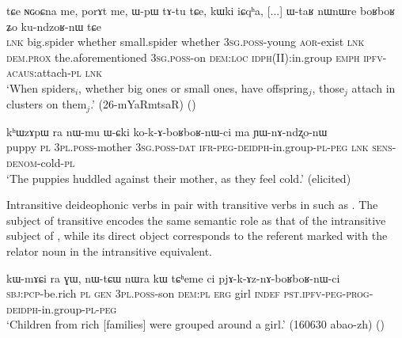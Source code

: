 \begin{exe}
\ex \label{ex:boRboR.kundzoRnW}
\gll tɕe ɴɢoɕna me, porɤt me, ɯ-pɯ tɤ-tu tɕe, kɯki iɕqʰa, [...] ɯ-taʁ nɯnɯre boʁboʁ ʑo ku-ndzoʁ-nɯ tɕe \\
\textsc{lnk} big.spider whether small.spider whether \textsc{3sg}.\textsc{poss}-young \textsc{aor}-exist \textsc{lnk} \textsc{dem}.\textsc{prox} the.aforementioned { } \textsc{3sg}.\textsc{poss}-on \textsc{dem}:\textsc{loc} \textsc{idph}(II):in.group \textsc{emph} \textsc{ipfv}-\textsc{acaus}:attach-\textsc{pl} \textsc{lnk} \\
\glt `When spiders$_i$, whether big ones or small ones, have offspring$_j$, those$_j$ attach in clusters on them$_j$.' (26-mYaRmtsaR)  
()
\end{exe}

\begin{exe}
\ex \label{ex:kokAboRboRnW}
\gll kʰɯzɤpɯ ra nɯ-mu ɯ-ɕki ko-k-ɤ-boʁboʁ-nɯ-ci ma ɲɯ-nɤ-ndʐo-nɯ \\
puppy \textsc{pl} \textsc{3pl}.\textsc{poss}-mother \textsc{3sg}.\textsc{poss}-\textsc{dat} \textsc{ifr}-\textsc{peg}-\textsc{deidph}-in.group-\textsc{pl}-\textsc{peg} \textsc{lnk} \textsc{sens}-\textsc{denom}-cold-\textsc{pl} \\
\glt `The puppies huddled against their mother, as they feel cold.' (elicited)
\end{exe}

Intransitive deideophonic verbs in   pair with transitive verbs in  such as . The subject of transitive  encodes the same semantic role as that of the intransitive subject of , while its direct object corresponds to the referent marked with the relator noun  in the intransitive equivalent.

\begin{exe}
\ex \label{ex:pjAkAznAboRboRnWci}
\gll kɯ-mɤɕi ra ɣɯ, nɯ-tɕɯ nɯra kɯ tɕʰeme ci pjɤ-k-ɤz-nɤ-boʁboʁ-nɯ-ci \\
\textsc{sbj}:\textsc{pcp}-be.rich \textsc{pl} \textsc{gen} \textsc{3pl}.\textsc{poss}-son \textsc{dem}:\textsc{pl} \textsc{erg} girl \textsc{indef} \textsc{pst}.\textsc{ipfv}-\textsc{peg}-\textsc{prog}-\textsc{deidph}-in.group-\textsc{pl}-\textsc{peg} \\
\glt `Children from rich [families] were grouped around a girl.' (160630 abao-zh)
()
\end{exe}

